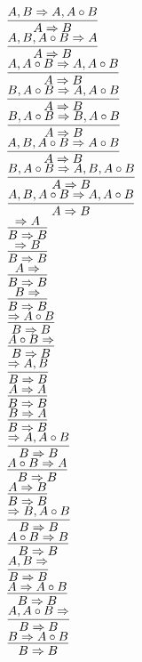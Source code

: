 \documentclass[11pt]{article}
\begin{document}
\begin{center}
\bigskip
\\$\infer{A\Rightarrow B}{A, B\Rightarrow A, A\circ B}$
\bigskip
\\$\infer{A\Rightarrow B}{A, B, A\circ B\Rightarrow A}$
\bigskip
\\$\infer{A\Rightarrow B}{A, A\circ B\Rightarrow A, A\circ B}$
\bigskip
\\$\infer{A\Rightarrow B}{B, A\circ B\Rightarrow A, A\circ B}$
\bigskip
\\$\infer{A\Rightarrow B}{B, A\circ B\Rightarrow B, A\circ B}$
\bigskip
\\$\infer{A\Rightarrow B}{A, B, A\circ B\Rightarrow A\circ B}$
\bigskip
\\$\infer{A\Rightarrow B}{B, A\circ B\Rightarrow A, B, A\circ B}$
\bigskip
\\$\infer{A\Rightarrow B}{A, B, A\circ B\Rightarrow A, A\circ B}$
\bigskip
\\$\infer{B\Rightarrow B}{\Rightarrow A}$
\bigskip
\\$\infer{B\Rightarrow B}{\Rightarrow B}$
\bigskip
\\$\infer{B\Rightarrow B}{A\Rightarrow }$
\bigskip
\\$\infer{B\Rightarrow B}{B\Rightarrow }$
\bigskip
\\$\infer{B\Rightarrow B}{\Rightarrow A\circ B}$
\bigskip
\\$\infer{B\Rightarrow B}{A\circ B\Rightarrow }$
\bigskip
\\$\infer{B\Rightarrow B}{\Rightarrow A, B}$
\bigskip
\\$\infer{B\Rightarrow B}{A\Rightarrow A}$
\bigskip
\\$\infer{B\Rightarrow B}{B\Rightarrow A}$
\bigskip
\\$\infer{B\Rightarrow B}{\Rightarrow A, A\circ B}$
\bigskip
\\$\infer{B\Rightarrow B}{A\circ B\Rightarrow A}$
\bigskip
\\$\infer{B\Rightarrow B}{A\Rightarrow B}$
\bigskip
\\$\infer{B\Rightarrow B}{\Rightarrow B, A\circ B}$
\bigskip
\\$\infer{B\Rightarrow B}{A\circ B\Rightarrow B}$
\bigskip
\\$\infer{B\Rightarrow B}{A, B\Rightarrow }$
\bigskip
\\$\infer{B\Rightarrow B}{A\Rightarrow A\circ B}$
\bigskip
\\$\infer{B\Rightarrow B}{A, A\circ B\Rightarrow }$
\bigskip
\\$\infer{B\Rightarrow B}{B\Rightarrow A\circ B}$

\end{center}
\end{document}
